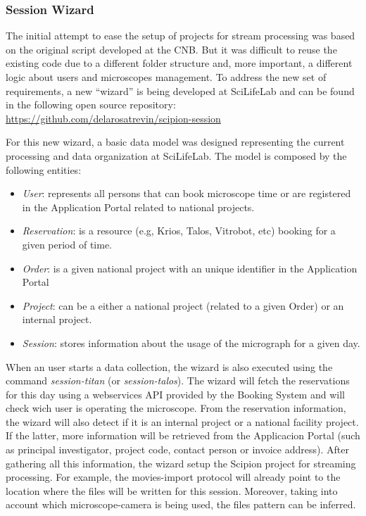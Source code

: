 \subsubsection{Session Wizard}

The initial attempt to ease the setup of \scipion projects for stream processing was based  
on the original script developed at the CNB. But it was difficult to reuse the existing code due to a different folder
structure and, more important, a different logic about users and microscopes management. To address the new set
of requirements, a new ``wizard'' is being developed at SciLifeLab and can be found in the following open source repository: 
\url{https://github.com/delarosatrevin/scipion-session}

For this new wizard, a basic data model was designed representing the current processing and data 
organization at SciLifeLab. The model is composed by the following entities:

\begin{itemize}
\setlength\itemsep{0em}
 \item \textit{User}: represents all persons that can book microscope time or are registered in the Application Portal 
 related to national projects.
 \item \textit{Reservation}:  is a resource (e.g, Krios, Talos, Vitrobot, etc) booking for a given period of time.
 \item \textit{Order}:  is a given national project with an unique identifier in the Application Portal
 \item \textit{Project}:  can be a either a national project (related to a given Order) or an internal project.
 \item \textit{Session}:  stores information about the usage of the micrograph for a given day.
\end{itemize}

When an user starts a data collection, the wizard is also executed using the command \textit{session-titan} 
(or \textit{session-talos}). The wizard will fetch the reservations for this day using a webservices API provided by 
the Booking System and will check wich user is operating the microscope. From the reservation information, 
the wizard will also detect if it is an internal project or a national facility project. If the latter,
more information will be retrieved from the Applicacion Portal (such as principal investigator, project code, 
contact person or invoice address). After gathering all this information, the wizard setup the Scipion project
for streaming processing. For example, the movies-import protocol will already point to the location where
the files will be written for this session. Moreover, taking into account which microscope-camera is being 
used, the files pattern can be inferred. 

